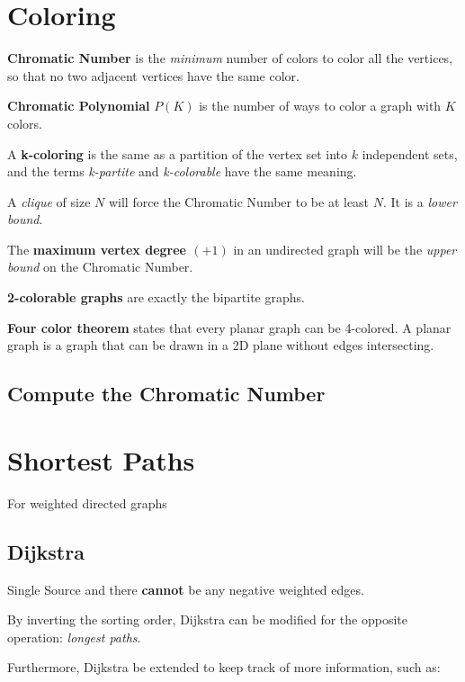 \section{Coloring}

	\textbf{Chromatic Number} is the \textit{minimum} number of colors to color all the vertices, so that no two adjacent vertices have the same color.

	\textbf{Chromatic Polynomial} $P(K)$ is the number of ways to color a graph with $K$ colors. 

	A \textbf{k-coloring} is the same as a partition of the vertex set into $k$ independent sets, and the terms \textit{k-partite} and \textit{k-colorable} have the same meaning.
	
	A \textit{clique} of size $N$ will force the Chromatic Number to be at least $N$. It is a \textit{lower bound}.

	The \textbf{maximum vertex degree $(+1)$} in an undirected graph will be the \textit{upper bound} on the Chromatic Number.

	\textbf{2-colorable graphs} are exactly the bipartite graphs.

	\textbf{Four color theorem} states that every planar graph can be 4-colored. 
	A planar graph is a graph that can be drawn in a 2D plane without edges intersecting.

	\subsection{Compute the Chromatic Number}
	

\section{Shortest Paths}

	For weighted directed graphs

	\subsection{Dijkstra}

		Single Source and there \textbf{cannot} be any negative weighted edges. 


		By inverting the sorting order, Dijkstra can be modified for the opposite operation: \textit{longest paths}.

		Furthermore, Dijkstra be extended to keep track of more information, such as:

